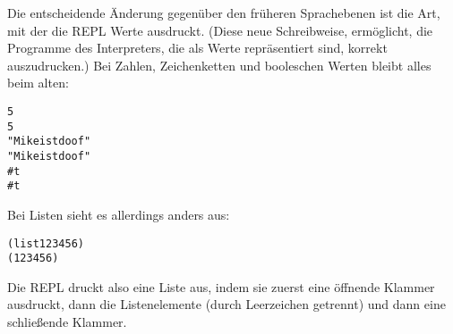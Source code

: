 Die entscheidende Änderung gegenüber den früheren Sprachebenen ist
die Art, mit der die REPL Werte ausdruckt.  (Diese neue Schreibweise,
ermöglicht, die Programme des Interpreters, die als Werte
repräsentiert sind, korrekt auszudrucken.)  Bei Zahlen, Zeichenketten
und booleschen Werten bleibt alles beim alten:
%
\begin{alltt}
5
\evalsto{} 5
"Mike ist doof"
\evalsto{} "Mike ist doof"
#t
\evalsto{} #t
\end{alltt}
%
Bei Listen sieht es allerdings anders aus:
%
\begin{alltt}
(list 1 2 3 4 5 6)
\evalsto{} (1 2 3 4 5 6)
\end{alltt}
%
Die REPL druckt also eine Liste aus, indem sie zuerst eine öffnende
Klammer ausdruckt, dann die Listenelemente (durch Leerzeichen
getrennt) und dann eine schließende Klammer.

